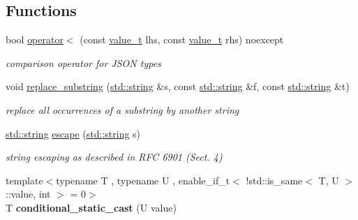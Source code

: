 \subsection*{Functions}
\begin{DoxyCompactItemize}
\item 
bool \hyperlink{namespacenlohmann_1_1detail_a09169efff3bd1771fff29bd92cea19e0}{operator$<$} (const \hyperlink{namespacenlohmann_1_1detail_a1ed8fc6239da25abcaf681d30ace4985}{value\+\_\+t} lhs, const \hyperlink{namespacenlohmann_1_1detail_a1ed8fc6239da25abcaf681d30ace4985}{value\+\_\+t} rhs) noexcept
\begin{DoxyCompactList}\small\item\em comparison operator for J\+S\+ON types \end{DoxyCompactList}\item 
void \hyperlink{namespacenlohmann_1_1detail_aceff996baf082d6dc1873ad176d10609}{replace\+\_\+substring} (\hyperlink{namespacenlohmann_1_1detail_a1ed8fc6239da25abcaf681d30ace4985ab45cffe084dd3d20d928bee85e7b0f21}{std\+::string} \&s, const \hyperlink{namespacenlohmann_1_1detail_a1ed8fc6239da25abcaf681d30ace4985ab45cffe084dd3d20d928bee85e7b0f21}{std\+::string} \&f, const \hyperlink{namespacenlohmann_1_1detail_a1ed8fc6239da25abcaf681d30ace4985ab45cffe084dd3d20d928bee85e7b0f21}{std\+::string} \&t)
\begin{DoxyCompactList}\small\item\em replace all occurrences of a substring by another string \end{DoxyCompactList}\item 
\hyperlink{namespacenlohmann_1_1detail_a1ed8fc6239da25abcaf681d30ace4985ab45cffe084dd3d20d928bee85e7b0f21}{std\+::string} \hyperlink{namespacenlohmann_1_1detail_a9d486a036924098fe1a77de14d23f56c}{escape} (\hyperlink{namespacenlohmann_1_1detail_a1ed8fc6239da25abcaf681d30ace4985ab45cffe084dd3d20d928bee85e7b0f21}{std\+::string} s)
\begin{DoxyCompactList}\small\item\em string escaping as described in R\+FC 6901 (Sect. 4) \end{DoxyCompactList}\item 
\mbox{\label{namespacenlohmann_1_1detail_af6c76d47b35f0493b1072b9323e98ca8}} 
{\footnotesize template$<$typename T , typename U , enable\+\_\+if\+\_\+t$<$ !std\+::is\+\_\+same$<$ T, U $>$\+::value, int $>$  = 0$>$ }\\T {\bfseries conditional\+\_\+static\+\_\+cast} (U value)

\end{DoxyCompactItemize}

